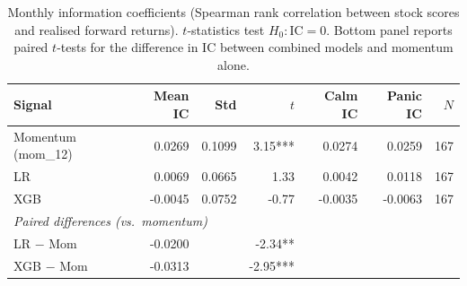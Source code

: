 \begin{table}[htbp]
\centering
\begin{tabular}{l r r r r r r}
\toprule
Signal & Mean IC & Std & $t$ & Calm IC & Panic IC & $N$ \\
\midrule
Momentum (mom\_12) & 0.0269 & 0.1099 & 3.15*** & 0.0274 & 0.0259 & 167 \\
LR & 0.0069 & 0.0665 & 1.33 & 0.0042 & 0.0118 & 167 \\
XGB & -0.0045 & 0.0752 & -0.77 & -0.0035 & -0.0063 & 167 \\
\midrule
\multicolumn{7}{l}{\textit{Paired differences (vs.\ momentum)}} \\
LR $-$ Mom & -0.0200 & & -2.34** & & & \\
XGB $-$ Mom & -0.0313 & & -2.95*** & & & \\
\bottomrule
\end{tabular}
\caption{Monthly information coefficients (Spearman rank correlation between stock scores and realised forward returns). $t$-statistics test $H_0\!: \text{IC} = 0$. Bottom panel reports paired $t$-tests for the difference in IC between combined models and momentum alone.}
\label{tab:ic}
\end{table}